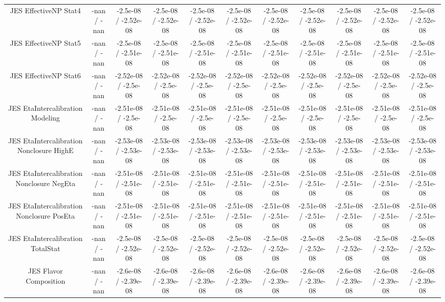 \begin{table}[htbp]
\begin{center}
\begin{tabular}{|c|c|c|c|c|c|c|c|c|c|c|}
  JES EffectiveNP Stat4 & -nan / -nan & -2.5e-08 / -2.52e-08 & -2.5e-08 / -2.52e-08 & -2.5e-08 / -2.52e-08 & -2.5e-08 / -2.52e-08 & -2.5e-08 / -2.52e-08 & -2.5e-08 / -2.52e-08 & -2.5e-08 / -2.52e-08 & -2.5e-08 / -2.52e-08 & -2.5e-08 / -2.52e-08 \\ 
  JES EffectiveNP Stat5 & -nan / -nan & -2.5e-08 / -2.51e-08 & -2.5e-08 / -2.51e-08 & -2.5e-08 / -2.51e-08 & -2.5e-08 / -2.51e-08 & -2.5e-08 / -2.51e-08 & -2.5e-08 / -2.51e-08 & -2.5e-08 / -2.51e-08 & -2.5e-08 / -2.51e-08 & -2.5e-08 / -2.51e-08 \\ 
  JES EffectiveNP Stat6 & -nan / -nan & -2.52e-08 / -2.5e-08 & -2.52e-08 / -2.5e-08 & -2.52e-08 / -2.5e-08 & -2.52e-08 / -2.5e-08 & -2.52e-08 / -2.5e-08 & -2.52e-08 / -2.5e-08 & -2.52e-08 / -2.5e-08 & -2.52e-08 / -2.5e-08 & -2.52e-08 / -2.5e-08 \\ 
  JES EtaIntercalibration Modeling & -nan / -nan & -2.51e-08 / -2.5e-08 & -2.51e-08 / -2.5e-08 & -2.51e-08 / -2.5e-08 & -2.51e-08 / -2.5e-08 & -2.51e-08 / -2.5e-08 & -2.51e-08 / -2.5e-08 & -2.51e-08 / -2.5e-08 & -2.51e-08 / -2.5e-08 & -2.51e-08 / -2.5e-08 \\ 
  JES EtaIntercalibration Nonclosure HighE & -nan / -nan & -2.53e-08 / -2.53e-08 & -2.53e-08 / -2.53e-08 & -2.53e-08 / -2.53e-08 & -2.53e-08 / -2.53e-08 & -2.53e-08 / -2.53e-08 & -2.53e-08 / -2.53e-08 & -2.53e-08 / -2.53e-08 & -2.53e-08 / -2.53e-08 & -2.53e-08 / -2.53e-08 \\ 
  JES EtaIntercalibration Nonclosure NegEta & -nan / -nan & -2.51e-08 / -2.51e-08 & -2.51e-08 / -2.51e-08 & -2.51e-08 / -2.51e-08 & -2.51e-08 / -2.51e-08 & -2.51e-08 / -2.51e-08 & -2.51e-08 / -2.51e-08 & -2.51e-08 / -2.51e-08 & -2.51e-08 / -2.51e-08 & -2.51e-08 / -2.51e-08 \\ 
  JES EtaIntercalibration Nonclosure PosEta & -nan / -nan & -2.51e-08 / -2.51e-08 & -2.51e-08 / -2.51e-08 & -2.51e-08 / -2.51e-08 & -2.51e-08 / -2.51e-08 & -2.51e-08 / -2.51e-08 & -2.51e-08 / -2.51e-08 & -2.51e-08 / -2.51e-08 & -2.51e-08 / -2.51e-08 & -2.51e-08 / -2.51e-08 \\ 
  JES EtaIntercalibration TotalStat & -nan / -nan & -2.5e-08 / -2.52e-08 & -2.5e-08 / -2.52e-08 & -2.5e-08 / -2.52e-08 & -2.5e-08 / -2.52e-08 & -2.5e-08 / -2.52e-08 & -2.5e-08 / -2.52e-08 & -2.5e-08 / -2.52e-08 & -2.5e-08 / -2.52e-08 & -2.5e-08 / -2.52e-08 \\ 
  JES Flavor Composition & -nan / -nan & -2.6e-08 / -2.39e-08 & -2.6e-08 / -2.39e-08 & -2.6e-08 / -2.39e-08 & -2.6e-08 / -2.39e-08 & -2.6e-08 / -2.39e-08 & -2.6e-08 / -2.39e-08 & -2.6e-08 / -2.39e-08 & -2.6e-08 / -2.39e-08 & -2.6e-08 / -2.39e-08 \\ 

\end{tabular}
\end{center}
\end{table}
